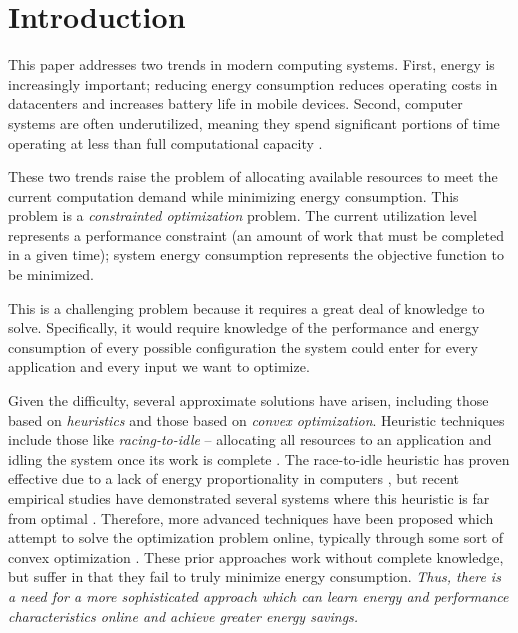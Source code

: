 
\section{Introduction}

This paper addresses two trends in modern computing systems.  First, energy is increasingly important; reducing energy consumption reduces operating costs in datacenters and increases battery life in mobile devices.  Second, computer systems are often underutilized, meaning they spend significant portions of time operating at less than full computational capacity \cite{}.

These two trends raise the problem of allocating available resources to meet the current computation demand while minimizing energy consumption. This problem is a \emph{constrainted optimization} problem. The current utilization level represents a performance constraint (\ie an amount of work that must be completed in a given time); system energy consumption represents the objective function to be minimized.

This is a challenging problem because it requires a great deal of knowledge to solve.  Specifically, it would require knowledge of the performance and energy consumption of every possible configuration the system could enter for every application and every input we want to optimize.

Given the difficulty, several approximate solutions have arisen, including those based on \emph{heuristics} and those based on \emph{convex optimization}.  Heuristic techniques include those like \emph{racing-to-idle} -- allocating all resources to an application and idling the system once its work is complete \cite{}.  The race-to-idle heuristic has proven effective due to a lack of energy proportionality in computers \cite{}, but recent empirical studies have demonstrated several systems where this heuristic is far from optimal \cite{}.  Therefore, more advanced techniques have been proposed which attempt to solve the optimization problem online, typically through some sort of convex optimization \cite{}. These prior approaches work without complete knowledge, but suffer in that they fail to truly minimize energy consumption.  \emph{Thus, there is a need for a more sophisticated approach which can learn energy and performance characteristics online and achieve greater energy savings.}


